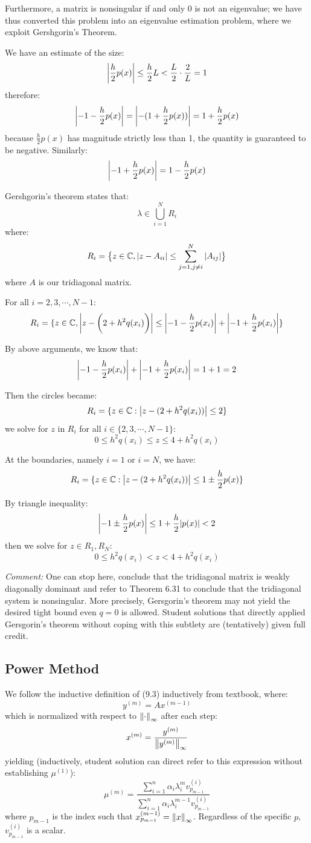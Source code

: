 \documentclass[12pt]{article} %
\newcommand{\cc}{\mathbb{C}}
\newcommand{\1}[1]{\mathds{1}\left[#1\right]}
\begin{document}
Furthermore, a matrix is nonsingular if and only $0$ is not an eigenvalue; we have thus converted this problem into an eigenvalue estimation problem, where we exploit Gershgorin's Theorem. 

We have an estimate of the size:
$$
	\abs{\frac{h}{2}p(x)} \le \frac{h}{2}L < \frac{L}{2}\cdot \frac{2}{L} = 1
$$ therefore:
$$
	\abs{-1-\frac{h}{2}p(x)} = \abs{-(1+\frac{h}{2}p(x))} = 1+\frac{h}{2}p(x)
$$ because $\frac{h}{2}p(x)$ has magnitude strictly less than 1, the quantity is guaranteed to be negative. Similarly:
$$
	\abs{-1+\frac{h}{2}p(x)} = 1-\frac{h}{2}p(x)
$$

Gershgorin's theorem states that:
$$
	\lambda \in \bigcup_{i=1}^NR_i
$$ where:
$$
	R_i = \big\{
	z\in\cc, \abs{z-A_{ii}}\le \sum_{j=1,j\neq i}^N\abs{A_{ij}}
	\big\}
$$ where $A$ is our tridiagonal matrix. 

For all $i=2,3,\cdots, N-1$:
$$
	R_i = \{z\in\cc, \abs{z-\bigg(2+h^2q(x_i)\bigg)}\le \abs{-1-\frac{h}{2}p(x_i)} + \abs{-1+\frac{h}{2}p(x_i)}\}
$$

By above arguments, we know that:
$$
	\abs{-1-\frac{h}{2}p(x_i)} + \abs{-1+\frac{h}{2}p(x_i)} = 1+1 = 2
$$

Then the circles became:
$$
	R_i = \{z\in\cc: \abs{z-(2+h^2q(x_i))} \le 2\}
$$ we solve for $z$ in $R_i$ for all $i\in\{2,3,\cdots, N-1\}$:
$$
	0\le h^2q(x_i)\le z\le 4+h^2q(x_i)
$$

At the boundaries, namely $i=1$ or $i=N$, we have:
$$
	R_i = \{z\in \cc: \abs{z-(2+h^2q(x_i))} \le 1\pm \frac{h}{2}p(x)\}
$$

By triangle inequality:
$$
	\abs{-1\pm \frac{h}{2}p(x)} \le 1 + \frac{h}{2}\abs{p(x)} < 2
$$ then we solve for $z\in R_1, R_N$:
$$
	 0\le h^2q(x_i)< z < 4+h^2q(x_i)
$$

\emph{Comment:} One can stop here, conclude that the tridiagonal matrix is weakly diagonally dominant and refer to Theorem 6.31 to conclude that the tridiagonal system is nonsingular. More precisely, Gersgorin's theorem may not yield the desired tight bound even $q=0$ is allowed. Student solutions that directly applied Gersgorin's theorem without coping with this subtlety are (tentatively) given full credit.

\newpage
\subsection{Power Method}
We follow the inductive definition of (9.3) inductively from textbook, where:
$$
	y^{(m)} = Ax^{(m-1)} 
$$ which is normalized with respect to $\norm{\cdot}_{\infty}$ after each step:
$$
	x^{(m)} = \frac{y^{(m)}}{\norm{y^{(m)}}_{\infty}}
$$ yielding (inductively, student solution can direct refer to this expression without establishing $\mu^{(1)}$):
$$
	\mu^{(m)} = \frac{\sum_{i=1}^n\alpha_i\lambda_i^m v^{(i)}_{p_{m-1}}}{\sum_{i=1}^n\alpha_i\lambda_i^{m-1} v^{(i)}_{p_{m-1}}}
$$ where $p_{m-1}$ is the index such that $x^{(m-1)}_{p_{m-1}} = \norm{x}_{\infty}$. Regardless of the specific $p$, $v_{p_{m-1}}^{(i)}$ is a scalar.
\end{document}
